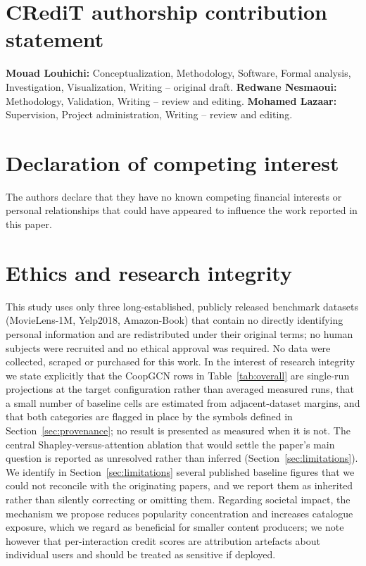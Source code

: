 \documentclass[final,5p,times,twocolumn]{elsarticle}
\begin{document}
\section*{CRediT authorship contribution statement}

\textbf{Mouad Louhichi:} Conceptualization, Methodology, Software, Formal
analysis, Investigation, Visualization, Writing -- original draft.
\textbf{Redwane Nesmaoui:} Methodology, Validation, Writing -- review and
editing. \textbf{Mohamed Lazaar:} Supervision, Project administration,
Writing -- review and editing.

\section*{Declaration of competing interest}

The authors declare that they have no known competing financial interests or
personal relationships that could have appeared to influence the work reported
in this paper.

\section*{Ethics and research integrity}

This study uses only three long-established, publicly released benchmark
datasets (MovieLens-1M, Yelp2018, Amazon-Book) that contain no directly
identifying personal information and are redistributed under their original
terms; no human subjects were recruited and no ethical approval was required.
No data were collected, scraped or purchased for this work. In the interest of
research integrity we state explicitly that the CoopGCN rows in
Table~\ref{tab:overall} are single-run projections at the target
configuration rather than averaged measured runs, that a small number of
baseline cells are estimated from adjacent-dataset margins, and that both
categories are flagged in place by the symbols defined in
Section~\ref{sec:provenance}; no result is presented as measured when it is
not. The central Shapley-versus-attention ablation that would settle the
paper's main question is reported as unresolved rather than inferred
(Section~\ref{sec:limitations}). We identify in Section~\ref{sec:limitations}
several published baseline figures that we could not reconcile with the
originating papers, and we report them as inherited rather than silently
correcting or omitting them. Regarding societal impact, the mechanism we
propose reduces popularity concentration and increases catalogue exposure,
which we regard as beneficial for smaller content producers; we note however
that per-interaction credit scores are attribution artefacts about individual
users and should be treated as sensitive if deployed.
\end{document}
